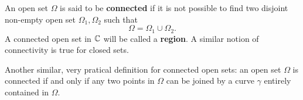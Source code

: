 \documentclass{exam}
\begin{document}
An open set $\Omega$ is said to be \textbf{connected} if it is not possible to find two disjoint 
non-empty open set $\Omega_1, \Omega_2$ such that
$$\Omega = \Omega_1 \cup \Omega_2.$$
A connected open set in $\mathbb{C}$ will be called a \textbf{region}. A similar notion of connectivity is 
true for closed sets.

Another similar, very pratical definition for connected open sets: an open set $\Omega$ is connected
if and only if any two points in $\Omega$ can be joined by a curve $\gamma$ entirely contained in $\Omega$. 
\end{document}
